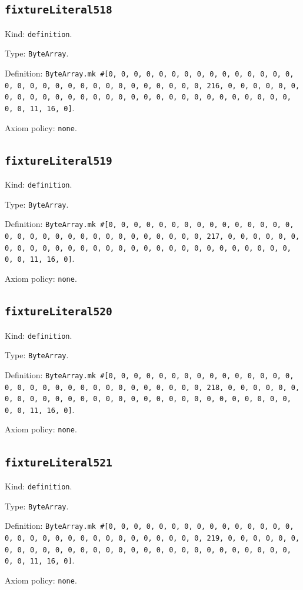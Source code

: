 \documentclass[11pt]{article}
\begin{document}
\subsection*{\texttt{fixtureLiteral518}}
\noindent Kind: \texttt{definition}.\par
\noindent Type: \texttt{ByteArray}.\par
\noindent Definition: \texttt{ByteArray.mk \#[0, 0, 0, 0, 0, 0, 0, 0, 0, 0, 0, 0, 0, 0, 0, 0, 0, 0, 0, 0, 0, 0, 0, 0, 0, 0, 0, 0, 0, 0, 0, 216, 0, 0, 0, 0, 0, 0, 0, 0, 0, 0, 0, 0, 0, 0, 0, 0, 0, 0, 0, 0, 0, 0, 0, 0, 0, 0, 0, 0, 0, 0, 0, 11, 16, 0]}.\par
\noindent Axiom policy: \texttt{none}.\par
\subsection*{\texttt{fixtureLiteral519}}
\noindent Kind: \texttt{definition}.\par
\noindent Type: \texttt{ByteArray}.\par
\noindent Definition: \texttt{ByteArray.mk \#[0, 0, 0, 0, 0, 0, 0, 0, 0, 0, 0, 0, 0, 0, 0, 0, 0, 0, 0, 0, 0, 0, 0, 0, 0, 0, 0, 0, 0, 0, 0, 217, 0, 0, 0, 0, 0, 0, 0, 0, 0, 0, 0, 0, 0, 0, 0, 0, 0, 0, 0, 0, 0, 0, 0, 0, 0, 0, 0, 0, 0, 0, 0, 11, 16, 0]}.\par
\noindent Axiom policy: \texttt{none}.\par
\subsection*{\texttt{fixtureLiteral520}}
\noindent Kind: \texttt{definition}.\par
\noindent Type: \texttt{ByteArray}.\par
\noindent Definition: \texttt{ByteArray.mk \#[0, 0, 0, 0, 0, 0, 0, 0, 0, 0, 0, 0, 0, 0, 0, 0, 0, 0, 0, 0, 0, 0, 0, 0, 0, 0, 0, 0, 0, 0, 0, 218, 0, 0, 0, 0, 0, 0, 0, 0, 0, 0, 0, 0, 0, 0, 0, 0, 0, 0, 0, 0, 0, 0, 0, 0, 0, 0, 0, 0, 0, 0, 0, 11, 16, 0]}.\par
\noindent Axiom policy: \texttt{none}.\par
\subsection*{\texttt{fixtureLiteral521}}
\noindent Kind: \texttt{definition}.\par
\noindent Type: \texttt{ByteArray}.\par
\noindent Definition: \texttt{ByteArray.mk \#[0, 0, 0, 0, 0, 0, 0, 0, 0, 0, 0, 0, 0, 0, 0, 0, 0, 0, 0, 0, 0, 0, 0, 0, 0, 0, 0, 0, 0, 0, 0, 219, 0, 0, 0, 0, 0, 0, 0, 0, 0, 0, 0, 0, 0, 0, 0, 0, 0, 0, 0, 0, 0, 0, 0, 0, 0, 0, 0, 0, 0, 0, 0, 11, 16, 0]}.\par
\noindent Axiom policy: \texttt{none}.\par
\end{document}
